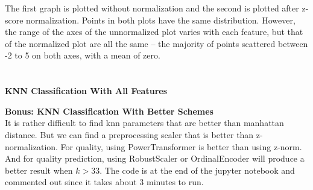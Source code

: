 \documentclass[12pt]{article}
\begin{document}
\noindent
The first graph is plotted without normalization and the second is plotted after z-score normalization. Points in both plots have the same distribution. However, the range of the axes of the unnormalized plot varies with each feature, but that of the normalized plot are all the same -- the majority of points scattered between -2 to 5 on both axes, with a mean of zero.\\\\\\
\textbf{KNN Classification With All Features}
\begin{figure}[H]
\captionsetup[subfigure]{labelformat=empty}
\centering
{}
\end{figure}
\noindent
\textbf{Bonus: KNN Classification With Better Schemes}\\
It is rather difficult to find knn parameters that are better than manhattan distance. But we can find a preprocessing scaler that is better than z-normalization. For quality, using PowerTransformer is better than using z-norm. And for quality prediction, using RobustScaler or OrdinalEncoder will produce a better result when $k>33$. The code is at the end of the jupyter notebook and commented out since it takes about 3 minutes to run.
\end{document}
